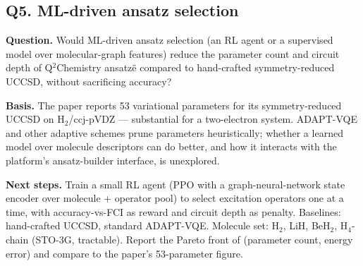 \subsection*{Q5. ML-driven ansatz selection}
\textbf{Question.} Would ML-driven ansatz selection (an RL agent
or a supervised model over molecular-graph features) reduce the
parameter count and circuit depth of Q$^2$Chemistry ansatz\"e
compared to hand-crafted symmetry-reduced UCCSD, without
sacrificing accuracy?

\textbf{Basis.} The paper reports 53 variational parameters for
its symmetry-reduced UCCSD on H$_2$/ccj-pVDZ --- substantial for a
two-electron system. ADAPT-VQE and other adaptive schemes prune
parameters heuristically; whether a learned model over molecule
descriptors can do better, and how it interacts with the
platform's ansatz-builder interface, is unexplored.

\textbf{Next steps.} Train a small RL agent (PPO with a
graph-neural-network state encoder over molecule + operator pool)
to select excitation operators one at a time, with accuracy-vs-FCI
as reward and circuit depth as penalty. Baselines: hand-crafted
UCCSD, standard ADAPT-VQE. Molecule set: H$_2$, LiH, BeH$_2$,
H$_4$-chain (STO-3G, tractable). Report the Pareto front of
(parameter count, energy error) and compare to the paper's
53-parameter figure.

